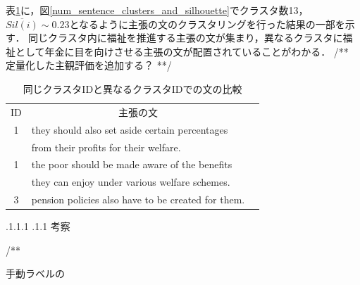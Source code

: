 \documentclass[a4paper, twocolumn, 10pt]{jarticle}
\makeatletter
\def\section{%
	\@startsection{section}{1}{\z@}%
	{.1\Cvs \@plus.1\Cdp \@minus.1\Cdp}%
	{.1\Cvs \@plus.1\Cdp}%
	{\normalfont\normalsize\bfseries}%
}
\makeatother
\begin{document}
表\ref{classification_result_samples}に，図\ref{num_sentence_clusters_and_silhouette}でクラスタ数13，$\overline{Sil(i)} \sim 0.23$となるように主張の文のクラスタリングを行った結果の一部を示す．
同じクラスタ内に福祉を推進する主張の文が集まり，異なるクラスタに福祉として年金に目を向けさせる主張の文が配置されていることがわかる．
/** 定量化した主観評価を追加する？ **/

\begin{table}[H]
  \caption{
      同じクラスタIDと異なるクラスタIDでの文の比較
    }
  \centering
  {\tabcolsep=0.05cm
    \begin{tabular}{clp{6cm}}
    \hline
    ID & \multicolumn{1}{c}{主張の文}
    \\
    1 & they should also set aside certain percentages
    \\
    & from their profits for their welfare.
    \\
    1 & the poor should be made aware of the benefits
    \\
    & they can enjoy under various welfare schemes.
    \\
    3 & pension policies also have to be created for them.
    \\
    \hline
    \end{tabular}
  }
  \label{classification_result_samples}
\end{table}














\section{考察}

/**

手動ラベルの
\end{document}
